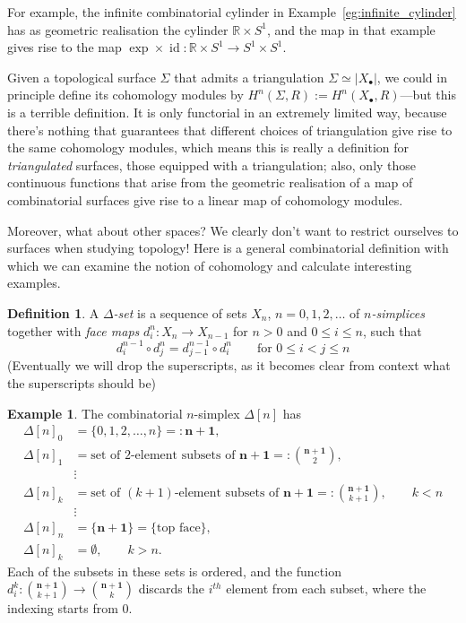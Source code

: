 \documentclass{tufte-handout}
\def\RR{\mathbb{R}}
\DeclareMathOperator{\id}{id}
\theoremstyle{definition}
\newtheorem{definition}{Definition}
\newtheorem{example}{Example}
\begin{document}
For example, the infinite combinatorial cylinder in Example~\ref{eg:infinite_cylinder} has as geometric 
realisation the cylinder $\RR \times S^1$, and the map in that example gives rise to the map
$\exp\times \id\colon \RR\times S^1 \to S^1\times S^1$.

Given a topological surface $\Sigma$ that admits a triangulation $\Sigma\simeq |X_\bullet|$,
we could in principle define its cohomology modules by $H^n(\Sigma,R) := H^n(X_\bullet,R)$---but
this is a terrible definition. It is only functorial in an extremely limited way, because 
there's nothing that guarantees that different choices of triangulation give rise to the 
same cohomology modules, which means this is really a definition for \emph{triangulated} surfaces, 
those equipped with a triangulation; also, only those continuous functions that arise from 
the geometric realisation of a map of combinatorial surfaces give rise
to a linear map of cohomology modules.

Moreover, what about other spaces? We clearly don't want to restrict ourselves to surfaces 
when studying topology! Here is a general combinatorial definition with which we can examine
the notion of cohomology and calculate interesting examples.

\begin{definition}
A \emph{$\Delta$-set} is a sequence of sets $X_n$, $n=0,1,2,\ldots$ of \emph{$n$-simplices} together
with \emph{face maps} $d_i^n\colon X_n\to X_{n-1}$ for $n>0$ and $0\leq i \leq n$, such that
\[
	d_i^{n-1}\circ d_j^n = d_{j-1}^{n-1} \circ d_i^n \qquad \text{for } 0 \leq i < j \leq n
\]
(Eventually we will drop the superscripts, as it becomes clear from context what the superscripts should be)
\end{definition}

\begin{example}
The combinatorial $n$-simplex $\Delta[n]$ has
\begin{align*}
\Delta[n]_0 & = \{0,1,2,\ldots,n\} =: \mathbf{n+1},\\
\Delta[n]_1 & = \text{set of 2-element subsets of }\mathbf{n+1} =:\binom{\mathbf{n+1}}{2},\\
&\vdots\\
\Delta[n]_k & = \text{set of $(k+1)$-element subsets of }\mathbf{n+1} =: \binom{\mathbf{n+1}}{k+1},\qquad k<n\\
&\vdots\\
\Delta[n]_n & = \{\mathbf{n+1}\} = \{\text{top face}\},\\
\Delta[n]_k & = \emptyset, \qquad k>n.
\end{align*}
Each of the subsets in these sets is ordered, and the function 
$d_i^k\colon\binom{\mathbf{n+1}}{k+1} \to \binom{\mathbf{n+1}}{k}$ discards the $i^{th}$ 
element from each subset, where the indexing starts from $0$.
\end{example}
\end{document}
